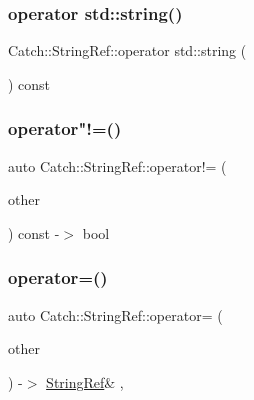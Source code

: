 \mbox{\label{class_catch_1_1_string_ref_ad9fde21785affacc32d7da7a70d74e93}} 
\subsubsection{\texorpdfstring{operator std\+::string()}{operator std::string()}}
{\footnotesize\ttfamily Catch\+::\+String\+Ref\+::operator std\+::string (\begin{DoxyParamCaption}{ }\end{DoxyParamCaption}) const}

\mbox{\label{class_catch_1_1_string_ref_aaa6c8bf61c4628034c19763d1c8ad215}} 
\subsubsection{\texorpdfstring{operator"!=()}{operator!=()}}
{\footnotesize\ttfamily auto Catch\+::\+String\+Ref\+::operator!= (\begin{DoxyParamCaption}\item[{\mbox{\hyperlink{class_catch_1_1_string_ref}{String\+Ref}} const \&}]{other }\end{DoxyParamCaption}) const -\/$>$  bool\hspace{0.3cm}{\ttfamily [noexcept]}}

\mbox{\label{class_catch_1_1_string_ref_a14d5a1983e33c51c6b5fd33bffbebabb}} 
\subsubsection{\texorpdfstring{operator=()}{operator=()}}
{\footnotesize\ttfamily auto Catch\+::\+String\+Ref\+::operator= (\begin{DoxyParamCaption}\item[{\mbox{\hyperlink{class_catch_1_1_string_ref}{String\+Ref}} const \&}]{other }\end{DoxyParamCaption}) -\/$>$ \mbox{\hyperlink{class_catch_1_1_string_ref}{String\+Ref}}\& \hspace{0.3cm}{\ttfamily [inline]}, {\ttfamily [noexcept]}}



